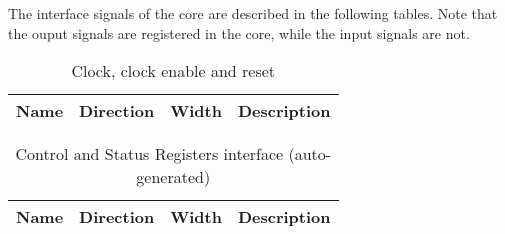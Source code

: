 The interface signals of the core are described in the following tables.
Note that the ouput signals are registered in the core, while the input signals are not.
\begin{table}[H]
  \centering
  \begin{tabularx}{\textwidth}{|l|l|r|X|}

    \hline
    \rowcolor{iob-green}
    {\bf Name} & {\bf Direction} & {\bf Width} & {\bf Description}  \\ \hline \hline

    

  \end{tabularx}
  \caption{Clock, clock enable and reset}
  \label{clk_en_rst_s_if_tab:is}
\end{table}

\begin{table}[H]
  \centering
  \begin{tabularx}{\textwidth}{|l|l|r|X|}

    \hline
    \rowcolor{iob-green}
    {\bf Name} & {\bf Direction} & {\bf Width} & {\bf Description}  \\ \hline \hline

    

  \end{tabularx}
  \caption{Control and Status Registers interface (auto-generated)}
  \label{iob_csrs_cbus_s_if_tab:is}
\end{table}
\clearpage